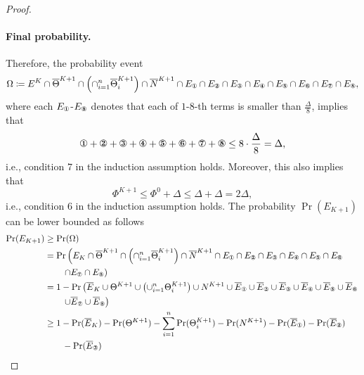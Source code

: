 \documentclass[a4paper,11pt]{article}
\begin{document}
\begin{proof}
    \paragraph{Final probability.}
    Therefore, the probability event 
    \[
    \Omega \eqdef E^K 
    \cap \overline{\Theta}^{K+1}
    \cap \left(\cap_{i=1}^n\overline{\Theta}^{K+1}_i\right)
    \cap \overline{N}^{K+1}
    \cap E_{\circledOne}
    \cap E_{\circledTwo}
    \cap E_{\circledThree}
    \cap E_{\circledFour}
    \cap E_{\circledFive}
    \cap E_{\circledSix}
    \cap E_{\circledSeven}
    \cap E_{\circledEight},
    \]
    where each $E_{\circledOne}$-$E_{\circledEight}$ denotes that each of $1$-$8$-th terms is smaller than $\frac{\Delta}{8}$, implies that 
    \[
    \circledOne + \circledTwo + \circledThree + \circledFour + \circledFive + \circledSix + \circledSeven + \circledEight \le 8\cdot \frac{\Delta}{8} = \Delta,
    \]
    i.e., condition $7$ in the induction assumption holds. Moreover, this also implies that 
    \[
    \Phi^{K+1} \le \Phi^0 + \Delta \le \Delta + \Delta = 2\Delta,
    \]
    i.e., condition $6$ in the induction assumption holds. The probability $\Pr(E_{K+1})$ can be lower bounded as follows 
    \begin{align*}
    \Pr(E_{K+1}) &\ge \Pr(\Omega)\\
    &= \Pr\left(E_K 
    \cap \overline{\Theta}^{K+1}
    \cap \left(\cap_{i=1}^n\overline{\Theta}^{K+1}_i\right)
    \cap \overline{N}^{K+1}
    \cap E_{\circledOne}
    \cap E_{\circledTwo}
    \cap E_{\circledThree}
    \cap E_{\circledFour}
    \cap E_{\circledFive}
    \cap E_{\circledSix}\right.\\
    &\qquad \left.
    \cap E_{\circledSeven}
    \cap E_{\circledEight}\right)\\
    &= 1 - \Pr\left(\overline{E}_K\cup
    \Theta^{K+1} \cup 
    \left(\cup_{i=1}^n\Theta^{K+1}_i\right)
    \cup N^{K+1}
    \cup \overline{E}_{\circledOne}
    \cup \overline{E}_{\circledTwo}
    \cup \overline{E}_{\circledThree}
    \cup \overline{E}_{\circledFour}
    \cup \overline{E}_{\circledFive}
    \cup \overline{E}_{\circledSix}\right.\\
    &\qquad \left. \cup \overline{E}_{\circledSeven}
    \cup \overline{E}_{\circledEight}\right)\\
    &\ge 1 - \Pr(\overline{E}_K) 
    - \Pr(\Theta^{K+1})
    - \sum_{i=1}^n\Pr(\Theta^{K+1}_i)
    -\Pr(N^{K+1})
    - \Pr(\overline{E}_{\circledOne})
    - \Pr(\overline{E}_{\circledTwo})\\
    & \qquad 
    - \Pr(\overline{E}_{\circledThree})

\end{align*}
\end{proof}
\end{document}
